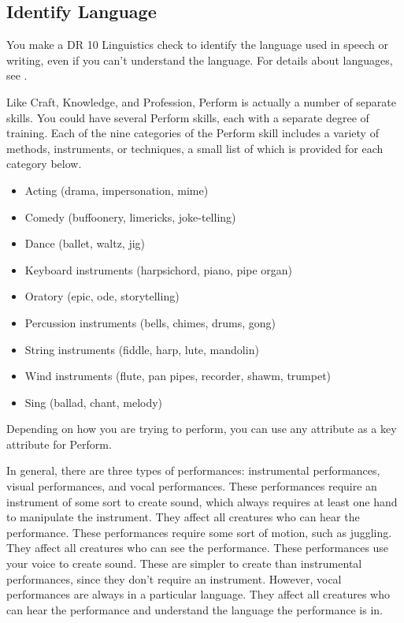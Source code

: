     \subsection{Identify Language}
        You make a DR 10 Linguistics check to identify the language used in speech or writing, even if you can't understand the language.
        For details about languages, see .

\newpage
{}
        \par Like Craft, Knowledge, and Profession, Perform is actually a number of separate skills.
        You could have several Perform skills, each with a separate degree of training.
        Each of the nine categories of the Perform skill includes a variety of methods, instruments, or techniques, a small list of which is provided for each category below.

        \begin{itemize}
            \item Acting (drama, impersonation, mime)
            \item Comedy (buffoonery, limericks, joke-telling)
            \item Dance (ballet, waltz, jig)
            \item Keyboard instruments (harpsichord, piano, pipe organ)
            \item Oratory (epic, ode, storytelling)
            \item Percussion instruments (bells, chimes, drums, gong)
            \item String instruments (fiddle, harp, lute, mandolin)
            \item Wind instruments (flute, pan pipes, recorder, shawm, trumpet)
            \item Sing (ballad, chant, melody)
        \end{itemize}

        Depending on how you are trying to perform, you can use any attribute as a key attribute for Perform.

        In general, there are three types of performances: instrumental performances, visual performances, and vocal performances.
         These performances require an instrument of some sort to create sound, which always requires at least one hand to manipulate the instrument.
        They affect all creatures who can hear the performance.
         These performances require some sort of motion, such as juggling.
        They affect all creatures who can see the performance.
         These performances use your voice to create sound.
        These are simpler to create than instrumental performances, since they don't require an instrument.
        However, vocal performances are always in a particular language.
        They affect all creatures who can hear the performance and understand the language the performance is in.

